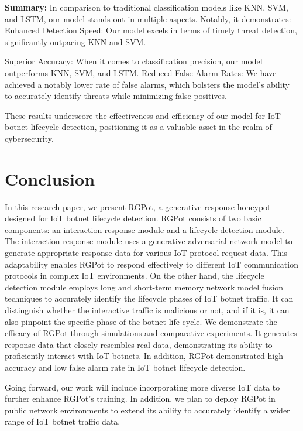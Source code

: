 \documentclass[journal]{IEEEtai}
\begin{document}
\textbf{Summary:}
In comparison to traditional classification models like KNN, SVM, and LSTM, our model stands out in multiple aspects. Notably, it demonstrates:
Enhanced Detection Speed: Our model excels in terms of timely threat detection, significantly outpacing KNN and SVM.

Superior Accuracy: When it comes to classification precision, our model outperforms KNN, SVM, and LSTM.
Reduced False Alarm Rates: We have achieved a notably lower rate of false alarms, which bolsters the model's ability to accurately identify threats while minimizing false positives.

These results underscore the effectiveness and efficiency of our model for IoT botnet lifecycle detection, positioning it as a valuable asset in the realm of cybersecurity.






\section{Conclusion}
In this research paper, we present RGPot, a generative response honeypot designed for IoT botnet lifecycle detection.
RGPot consists of two basic components: an interaction response module and a lifecycle detection module.
The interaction response module uses a generative adversarial network model to generate appropriate response data for various IoT protocol request data.
This adaptability enables RGPot to respond effectively to different IoT communication protocols in complex IoT environments.
On the other hand, the lifecycle detection module employs long and short-term memory network model fusion techniques to accurately identify the lifecycle phases of IoT botnet traffic.
It can distinguish whether the interactive traffic is malicious or not, and if it is, it can also pinpoint the specific phase of the botnet life cycle.
We demonstrate the efficacy of RGPot through simulations and comparative experiments.
It generates response data that closely resembles real data, demonstrating its ability to proficiently interact with IoT botnets.
In addition, RGPot demonstrated high accuracy and low false alarm rate in IoT botnet lifecycle detection.

Going forward, our work will include incorporating more diverse IoT data to further enhance RGPot's training.
In addition, we plan to deploy RGPot in public network environments to extend its ability to accurately identify a wider range of IoT botnet traffic data.
\end{document}
